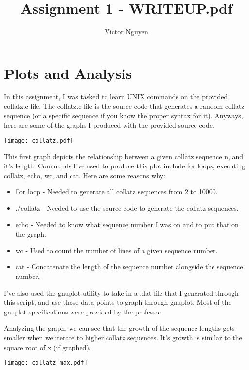 \documentclass[11pt]{article}
\title{Assignment 1 - WRITEUP.pdf}
\author{Victor Nguyen}
\begin{document}
\maketitle

\section{Plots and Analysis}
In this assignment, I was tasked to learn UNIX commands on the provided collatz.c file. The 
collatz.c file is the source code that generates a random collatz sequence (or a specific sequence 
if you know the proper syntax for it). Anyways, here are some of the graphs I produced with the 
provided source code.

\begin{center}
\texttt{[image: collatz.pdf]}
\end{center}

\noindent This first graph depicts the relationship between a given collatz sequence n, and it's 
length. Commands I've used to produce this plot include for loops, executing collatz, echo, wc, and 
cat. Here are some reasons why:

\begin{itemize}
    \item
    For loop - Needed to generate all collatz sequences from 2 to 10000.
    \item
    ./collatz - Needed to use the source code to generate the collatz sequences.
    \item
    echo - Needed to know what sequence number I was on and to put that on the graph.
    \item
    wc - Used to count the number of lines of a given sequence number.
    \item
    cat - Concatenate the length of the sequence number alongside the sequence number.
\end{itemize}

\noindent
I've also used the gnuplot utility to take in a .dat file that I generated through this script, 
and use those data points to graph through gnuplot. Most of the gnuplot specifications were 
provided by the professor.

\noindent
Analyzing the graph, we can see that the growth of the sequence lengths gets smaller when we 
iterate to higher collatz sequences. It's growth is similar to the square root of x (if graphed). 


\begin{center}
\texttt{[image: collatz\_max.pdf]}
\end{center}
\end{document}
